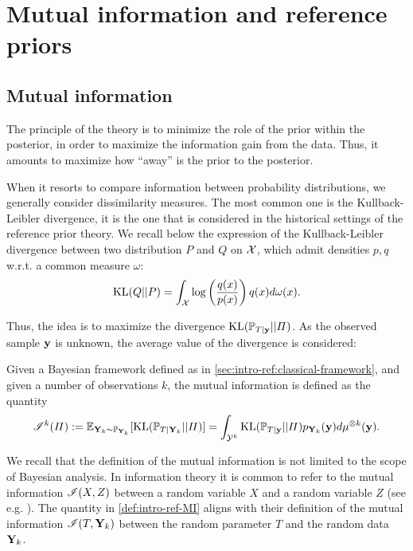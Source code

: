 
\section{Mutual information and reference priors}\label{sec:intro-ref:mutalinfo-ref-priors}

\subsection{Mutual information}\label{sec:intro-ref:mutualinfo}


The principle of the theory 
is to minimize the role of the prior within the posterior, in order to maximize the information gain from the data.
Thus, it amounts to maximize how ``away'' is the prior to the posterior.

When it resorts to compare information between probability distributions, we generally consider dissimilarity measures. The most common one is the Kullback-Leibler divergence, it is the one that is considered in the historical settings of the reference prior theory.
We recall below the expression of the Kullback-Leibler divergence between two distribution $P$ and $Q$ on $\mathcal{X}$, which admit densities $p,q$ w.r.t. a common measure $\omega$:
    \begin{equation}
        \text{KL}(Q||P)=\int_{\mathcal{X}}\log\left(\frac{q(x)}{p(x)}\right)q(x)d\omega(x).
    \end{equation}

Thus, the idea is to maximize the divergence $\text{KL}(\mathbb{P}_{T|\mathbf{y}}||\varPi)$. As the observed sample $\mathbf{y}$ is unknown, the average value of the divergence is considered:
\begin{defi}\label{def:intro-ref-MI}
    Given a Bayesian framework defined as in \cref{sec:intro-ref:classical-framework}, and given a number of observations $k$, the mutual information is defined as the quantity
    \begin{equation}
        \mathscr{I}^k(\varPi) :=  \mathbb{E}_{\mathbf{Y}_k\sim \mathbb{P}_{\mathbf{Y}_k}}[\text{KL}(\mathbb{P}_{T|\mathbf{Y}_k}||\varPi)] =  \int_{\mathcal{Y}^k}\text{KL}(\mathbb{P}_{T|\mathbf{y}}||\varPi) p_{\mathbf{Y}_k}(\mathbf{y})d\mu^{\otimes k}(\mathbf{y}).
    \end{equation}
\end{defi}



We recall that the definition of the mutual information is not limited to the scope of Bayesian analysis. In information theory it is common to refer to the mutual information $\mathscr{I}(X,Z)$ between a random variable $X$ and a random variable $Z$ (see e.g. \cite{mackay_information_2003}). The quantity in \cref{def:intro-ref-MI} aligns with their definition of the mutual information $\mathscr{I}(T,\mathbf{Y}_k)$ between the random parameter $T$ and the random data $\mathbf{Y}_k$.

